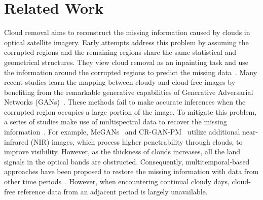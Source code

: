 \documentclass[a4paper,fleqn]{cas-dc}
\begin{document}
\section{Related Work}
 Cloud removal aims to reconstruct the missing information caused by clouds in optical satellite imagery.
Early attempts address this problem by assuming the corrupted regions and the remaining regions share the same statistical and geometrical structures. They view cloud removal as an inpainting task and use the information around the corrupted regions to predict the missing data~\citep{chan2001nontexture, maalouf2009bandelet}. Many recent studies learn the mapping between cloudy and cloud-free images by benefiting from the remarkable generative capabilities of Generative Adversarial Networks (GANs)~\cite{singh2018cloud, wen2021generative, 9667372}. These methods fail to make accurate inferences when the corrupted region occupies a large portion of the image. 
To mitigate this problem, a series of studies make use of multispectral data to recover the missing information~\citep{shen2013compressed, xu2015thin, enomoto2017filmy}. For example, McGANs~\citep{enomoto2017filmy} and CR-GAN-PM~\citep{li2020thin} utilize additional near-infrared (NIR) images, which process higher penetrability through clouds, to improve visibility. However, as the thickness of clouds increases, all the land signals in the optical bands are obstructed. Consequently, multitemporal-based approaches have been proposed to restore the missing information with data from other time periods~\citep{scarpa2018cnn, shen2019spatiotemporal, zhang2021combined, gao2021sentinel, sen12mscrts}. However, when encountering continual cloudy days, cloud-free reference data from an adjacent period is largely unavailable.
\end{document}

